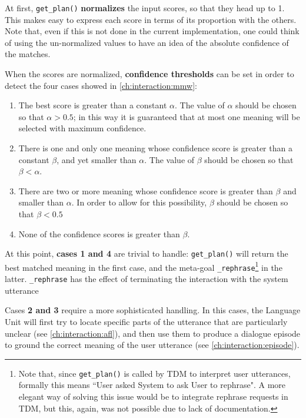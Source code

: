 At first, \texttt{get\_plan()} \textbf{normalizes} the input scores, so that they head up to 1. This makes easy to express each score in terms of its proportion with the others. Note that, even if this is not done in the current implementation, one could think of using the un-normalized values to have an idea of the absolute confidence of the matches.

When the scores are normalized, \textbf{confidence thresholds} can be set in order to detect the four cases showed in \ref{ch:interaction:mmw}:
\begin{enumerate}
	\item The best score is greater than a constant $\alpha$. The value of $\alpha$ should be chosen so that $\alpha > 0.5$; in this way it is guaranteed that at most one meaning will be selected with maximum confidence.
	\item There is one and only one meaning whose confidence score is greater than a constant $\beta$, and yet smaller than $\alpha$. The value of $\beta$ should be chosen so that $\beta < \alpha$.
	\item There are two or more meaning whose confidence score is greater than $\beta$ and smaller than $\alpha$. In order to allow for this possibility, $\beta$ should be chosen so that $\beta < 0.5$
	\item None of the confidence scores is greater than $\beta$.
\end{enumerate}

At this point, \textbf{cases 1 and 4} are trivial to handle: \texttt{get\_plan()} will return the best matched meaning in the first case, and the meta-goal \texttt{\_rephrase}\footnote{Note that, since \texttt{get\_plan()} is called by TDM to interpret user utterances, formally this means ``User asked System to ask User to rephrase". A more elegant way of solving this issue would be to integrate rephrase requests in TDM, but this, again, was not possible due to lack of documentation.} in the latter. \texttt{\_rephrase} has the effect of terminating the interaction with the system utterance

Cases \textbf{2 and 3} require a more sophisticated handling. In this cases, the Language Unit will first try to locate specific parts of the utterance that are particularly unclear (see \ref{ch:interaction:afl}), and then use them to produce a dialogue episode to ground the correct meaning of the user utterance (see \ref{ch:interaction:episode}).


